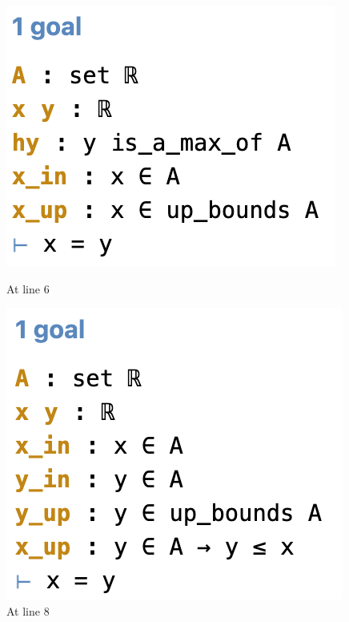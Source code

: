 \documentclass[a4paper]{article}
\theoremstyle{bfnote} %
\theoremstyle{bfnote}                  %
\theoremstyle{example}                       %
\theoremstyle{remark}                       %
\numberwithin{equation}{section}
\begin{document}
\begin{figure}[!htb]
  \includegraphics[width=\linewidth]{line6.png}
  \caption{At line 6}\label{fig:awesome_image1}
\endminipage\hfill
{}
  \includegraphics[width=\linewidth]{line8.png}
  \caption{At line 8}\label{fig:awesome_image2}
\endminipage\hfill
{}%

\end{figure}
\end{document}
